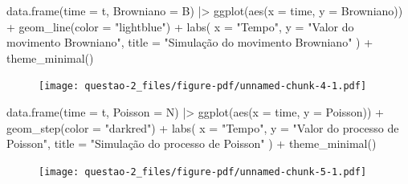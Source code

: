 \documentclass[
  letterpaper,
  DIV=11,
  numbers=noendperiod]{scrreprt}
\newenvironment{Shaded}{\begin{snugshade}}{\end{snugshade}}
\newcommand{\AttributeTok}[1]{\textcolor[rgb]{0.40,0.45,0.13}{#1}}
\newcommand{\FunctionTok}[1]{\textcolor[rgb]{0.28,0.35,0.67}{#1}}
\newcommand{\NormalTok}[1]{\textcolor[rgb]{0.00,0.23,0.31}{#1}}
\newcommand{\SpecialCharTok}[1]{\textcolor[rgb]{0.37,0.37,0.37}{#1}}
\newcommand{\StringTok}[1]{\textcolor[rgb]{0.13,0.47,0.30}{#1}}
\begin{document}
\begin{Shaded}
\begin{Highlighting}[]
\FunctionTok{data.frame}\NormalTok{(}\AttributeTok{time =}\NormalTok{ t, }\AttributeTok{Browniano =}\NormalTok{ B) }\SpecialCharTok{|\textgreater{}} 
    \FunctionTok{ggplot}\NormalTok{(}\FunctionTok{aes}\NormalTok{(}\AttributeTok{x =}\NormalTok{ time, }\AttributeTok{y =}\NormalTok{ Browniano)) }\SpecialCharTok{+}
    \FunctionTok{geom\_line}\NormalTok{(}\AttributeTok{color =} \StringTok{"lightblue"}\NormalTok{) }\SpecialCharTok{+}
    \FunctionTok{labs}\NormalTok{(}
        \AttributeTok{x =} \StringTok{"Tempo"}\NormalTok{,}
        \AttributeTok{y =} \StringTok{"Valor do movimento Browniano"}\NormalTok{,}
        \AttributeTok{title =} \StringTok{"Simulação do movimento Browniano"}
\NormalTok{    ) }\SpecialCharTok{+}
    \FunctionTok{theme\_minimal}\NormalTok{()}
\end{Highlighting}
\end{Shaded}

\begin{figure}[H]

{\centering \texttt{[image: questao-2\_files/figure-pdf/unnamed-chunk-4-1.pdf]}

}

\end{figure}

\begin{Shaded}
\begin{Highlighting}[]
\FunctionTok{data.frame}\NormalTok{(}\AttributeTok{time =}\NormalTok{ t, }\AttributeTok{Poisson =}\NormalTok{ N) }\SpecialCharTok{|\textgreater{}} 
    \FunctionTok{ggplot}\NormalTok{(}\FunctionTok{aes}\NormalTok{(}\AttributeTok{x =}\NormalTok{ time, }\AttributeTok{y =}\NormalTok{ Poisson)) }\SpecialCharTok{+}
    \FunctionTok{geom\_step}\NormalTok{(}\AttributeTok{color =} \StringTok{"darkred"}\NormalTok{) }\SpecialCharTok{+}
    \FunctionTok{labs}\NormalTok{(}
        \AttributeTok{x =} \StringTok{"Tempo"}\NormalTok{,}
        \AttributeTok{y =} \StringTok{"Valor do processo de Poisson"}\NormalTok{,}
        \AttributeTok{title =} \StringTok{"Simulação do processo de Poisson"}
\NormalTok{    ) }\SpecialCharTok{+}
    \FunctionTok{theme\_minimal}\NormalTok{()}
\end{Highlighting}
\end{Shaded}

\begin{figure}[H]

{\centering \texttt{[image: questao-2\_files/figure-pdf/unnamed-chunk-5-1.pdf]}

}

\end{figure}
\end{document}
